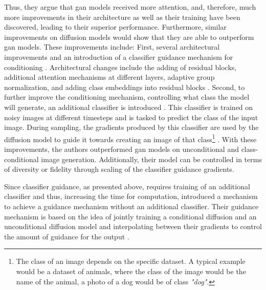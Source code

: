 Thus, they argue that \gls{gan} \glspl{model} received more attention, and, therefore, much more improvements in their architecture as well as their training have been discovered, leading to their superior performance.
Furthermore, similar improvements on diffusion \glspl{model} would show that they are able to outperform \gls{gan} \glspl{model}.
These improvements include:
First, several architectural improvements \cite[section 3]{dhariwal2021DiffusionModelsBeat} and an introduction of a classifier guidance mechanism for conditioning \cite[section 4]{dhariwal2021DiffusionModelsBeat}.
Architectural changes include the adding of residual blocks, additional attention mechanisms at different layers, adaptive group normalization, and adding class embeddings into residual blocks \cite{dhariwal2021DiffusionModelsBeat}.
Second, to further improve the conditioning mechanism, \ie controlling what class the \gls{model} will generate, an additional classifier is introduced \cite{dhariwal2021DiffusionModelsBeat}. 
This classifier is trained on noisy images at different timesteps and is tasked to predict the class of the input image.
During sampling, the gradients produced by this classifier are used by the diffusion \gls{model} to guide it towards creating an image of that class\footnote{The class of an image depends on the specific dataset. A typical example would be a dataset of animals, where the class of the image would be the name of the animal, \eg a photo of a dog would be of class \textit{"dog"}.} \cite{dhariwal2021DiffusionModelsBeat}.
With these improvements, the authors outperformed \gls{gan} \glspl{model} on unconditional and class-conditional image generation.
Additionally, their \gls{model} can be controlled in terms of diversity or fidelity through scaling of the classifier guidance gradients.

Since classifier guidance, as presented above, requires training of an additional classifier and thus, increasing the time for computation, \cite{ho2022ClassifierFreeDiffusionGuidance}
introduced a mechanism to achieve a guidance mechanism without an additional classifier.  
Their guidance mechanism is based on the idea of jointly training a conditional diffusion and an unconditional diffusion \gls{model} and interpolating between their gradients to control the amount of guidance for the output \cite{ho2022ClassifierFreeDiffusionGuidance}.

